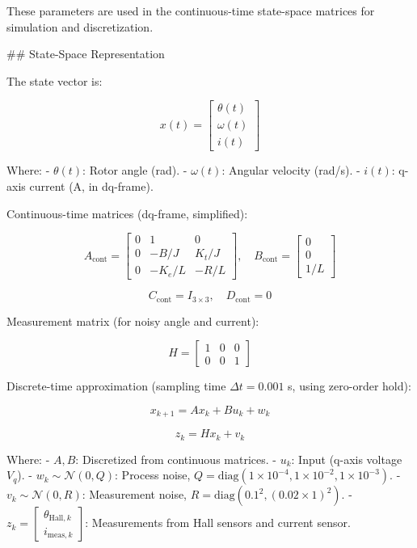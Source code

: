 These parameters are used in the continuous-time state-space matrices for simulation and discretization.

## State-Space Representation

The state vector is:

\[ x(t) = \begin{bmatrix} \theta(t) \\ \omega(t) \\ i(t) \end{bmatrix} \]

Where:
- \( \theta(t) \): Rotor angle (rad).
- \( \omega(t) \): Angular velocity (rad/s).
- \( i(t) \): q-axis current (A, in dq-frame).

Continuous-time matrices (dq-frame, simplified):

\[ A_{\text{cont}} = \begin{bmatrix} 0 & 1 & 0 \\ 0 & -B/J & K_t/J \\ 0 & -K_e/L & -R/L \end{bmatrix}, \quad B_{\text{cont}} = \begin{bmatrix} 0 \\ 0 \\ 1/L \end{bmatrix} \]

\[ C_{\text{cont}} = I_{3 \times 3}, \quad D_{\text{cont}} = 0 \]

Measurement matrix (for noisy angle and current):

\[ H = \begin{bmatrix} 1 & 0 & 0 \\ 0 & 0 & 1 \end{bmatrix} \]

Discrete-time approximation (sampling time \( \Delta t = 0.001 \) s, using zero-order hold):

\[ x_{k+1} = A x_k + B u_k + w_k \]

\[ z_k = H x_k + v_k \]

Where:
- \( A, B \): Discretized from continuous matrices.
- \( u_k \): Input (q-axis voltage \( V_q \)).
- \( w_k \sim \mathcal{N}(0, Q) \): Process noise, \( Q = \text{diag}(1 \times 10^{-4}, 1 \times 10^{-2}, 1 \times 10^{-3}) \).
- \( v_k \sim \mathcal{N}(0, R) \): Measurement noise, \( R = \text{diag}(0.1^2, (0.02 \times 1)^2) \).
- \( z_k = \begin{bmatrix} \theta_{\text{Hall},k} \\ i_{\text{meas},k} \end{bmatrix} \): Measurements from Hall sensors and current sensor.

